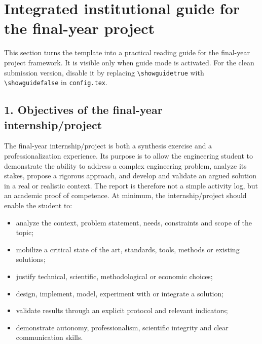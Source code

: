 \chapter*{Integrated institutional guide for the final-year project}

\begin{guidebox}
This section turns the template into a practical reading guide for the final-year project framework. It is visible only when guide mode is activated. For the clean submission version, disable it by replacing \texttt{\textbackslash showguidetrue} with \texttt{\textbackslash showguidefalse} in \texttt{config.tex}.
\end{guidebox}

\section*{1. Objectives of the final-year internship/project}

The final-year internship/project is both a synthesis exercise and a professionalization experience. Its purpose is to allow the engineering student to demonstrate the ability to address a complex engineering problem, analyze its stakes, propose a rigorous approach, and develop and validate an argued solution in a real or realistic context. The report is therefore not a simple activity log, but an academic proof of competence. At minimum, the internship/project should enable the student to:

\begin{itemize}[leftmargin=1.2cm]
\item analyze the context, problem statement, needs, constraints and scope of the topic;
\item mobilize a critical state of the art, standards, tools, methods or existing solutions;
\item justify technical, scientific, methodological or economic choices;
\item design, implement, model, experiment with or integrate a solution;
\item validate results through an explicit protocol and relevant indicators;
\item demonstrate autonomy, professionalism, scientific integrity and clear communication skills.
\end{itemize}


